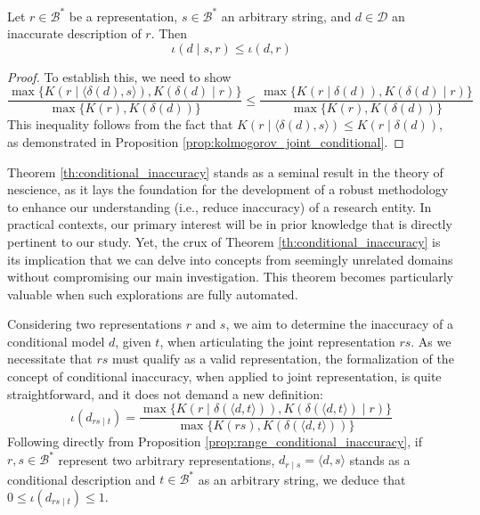 \begin{theorem}
\label{th:conditional_inaccuracy}
Let $r \in \mathcal{B}^\ast$ be a representation, $s \in \mathcal{B}^\ast$ an arbitrary string, and $d \in \mathcal{D}$ an inaccurate description of $r$. Then
\[
\iota(d \mid s, r) \leq \iota(d, r)
\]
\end{theorem}
\begin{proof}
To establish this, we need to show 
\[
\frac{ \max\{ K \left(r \mid \langle \delta(d), s \rangle \right), K \left( \delta(d) \mid r \right) \} } { \max\{ K(r), K \left(\delta(d) \right) \} } \leq \frac{ \max\{ K \left(r \mid \delta(d) \right), K \left( \delta(d) \mid r \right) \} } { \max\{ K(r), K \left(\delta(d) \right) \} }
\]
This inequality follows from the fact that $K \left(r \mid \langle \delta(d), s \rangle \right) \leq  K \left(r \mid \delta(d) \right)$, as demonstrated in Proposition \ref{prop:kolmogorov_joint_conditional}.
\end{proof}

Theorem \ref{th:conditional_inaccuracy} stands as a seminal result in the theory of nescience, as it lays the foundation for the development of a robust methodology to enhance our understanding (i.e., reduce inaccuracy) of a research entity. In practical contexts, our primary interest will be in prior knowledge that is directly pertinent to our study. Yet, the crux of Theorem \ref{th:conditional_inaccuracy} is its implication that we can delve into concepts from seemingly unrelated domains without compromising our main investigation. This theorem becomes particularly valuable when such explorations are fully automated.

Considering two representations $r$ and $s$, we aim to determine the inaccuracy of a conditional model $d$, given $t$, when articulating the joint representation $rs$. As we necessitate that $rs$ must qualify as a valid representation, the formalization of the concept of conditional inaccuracy, when applied to joint representation, is quite straightforward, and it does not demand a new definition:
\[
\iota(d_{rs \mid t}) = \frac{ \max\{ K \left(r \mid \delta(\langle d, t \rangle) \right), K \left( \delta(\langle d, t \rangle) \mid r \right) \} } { \max\{ K(rs), K \left(\delta(\langle d, t \rangle) \right) \} }
\]
Following directly from Proposition \ref{prop:range_conditional_inaccuracy}, if $r, s \in \mathcal{B}^\ast$ represent two arbitrary representations, $d_{r \mid s} = \langle d, s \rangle$ stands as a conditional description and $t \in \mathcal{B}^\ast$ as an arbitrary string, we deduce that $0 \leq \iota(d_{rs \mid t}) \leq 1$.

